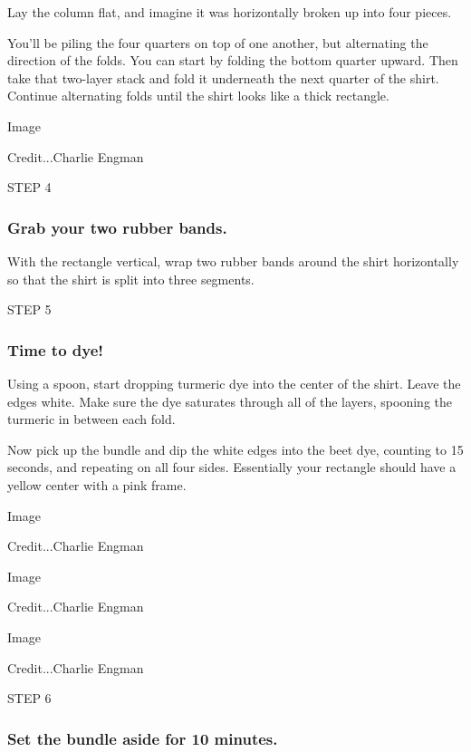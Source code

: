 Lay the column flat, and imagine it was horizontally broken up into four
pieces.

You'll be piling the four quarters on top of one another, but
alternating the direction of the folds. You can start by folding the
bottom quarter upward. Then take that two-layer stack and fold it
underneath the next quarter of the shirt. Continue alternating folds
until the shirt looks like a thick rectangle.

Image

Credit...Charlie Engman

STEP 4

\hypertarget{grab-your-two-rubber-bands}{%
\subsubsection{\texorpdfstring{\textbf{Grab your two rubber
bands.}}{Grab your two rubber bands.}}\label{grab-your-two-rubber-bands}}

With the rectangle vertical, wrap two rubber bands around the shirt
horizontally so that the shirt is split into three segments.

STEP 5

\hypertarget{time-to-dye}{%
\subsubsection{\texorpdfstring{\textbf{Time to
dye!}}{Time to dye!}}\label{time-to-dye}}

Using a spoon, start dropping turmeric dye into the center of the shirt.
Leave the edges white. Make sure the dye saturates through all of the
layers, spooning the turmeric in between each fold.

Now pick up the bundle and dip the white edges into the beet dye,
counting to 15 seconds, and repeating on all four sides. Essentially
your rectangle should have a yellow center with a pink frame.

Image

Credit...Charlie Engman

Image

Credit...Charlie Engman

Image

Credit...Charlie Engman

STEP 6

\hypertarget{set-the-bundle-aside-for-10-minutes}{%
\subsubsection{\texorpdfstring{\textbf{Set the bundle aside for 10
minutes.}}{Set the bundle aside for 10 minutes.}}\label{set-the-bundle-aside-for-10-minutes}}

